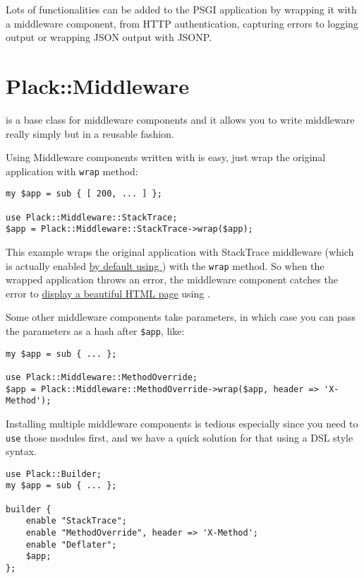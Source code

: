 Lots of functionalities can be added to the PSGI application by wrapping
it with a middleware component, from HTTP authentication, capturing
errors to logging output or wrapping JSON output with JSONP.

\section{Plack::Middleware}\label{plackmiddleware}

\href{http://search.cpan.org/perldoc?Plack::Middleware}{}
is a base class for middleware components and it allows you to write
middleware really simply but in a reusable fashion.

Using Middleware components written with  is easy, just
wrap the original application with \lstinline!wrap! method:

\begin{lstlisting}
my $app = sub { [ 200, ... ] };

use Plack::Middleware::StackTrace;
$app = Plack::Middleware::StackTrace->wrap($app);
\end{lstlisting}

This example wraps the original application with StackTrace middleware
(which is actually enabled
\href{http://advent.plackperl.org/2009/12/day-3-using-plackup.html}{by
default using }) with the \lstinline!wrap! method. So when the
wrapped application throws an error, the middleware component catches
the error to
\href{http://bulknews.typepad.com/blog/2009/10/develstacktraceashtml.html}{display
a beautiful HTML page} using .

Some other middleware components take parameters, in which case you can
pass the parameters as a hash after \lstinline!$app!, like:

\begin{lstlisting}
my $app = sub { ... };

use Plack::Middleware::MethodOverride;
$app = Plack::Middleware::MethodOverride->wrap($app, header => 'X-Method');
\end{lstlisting}

Installing multiple middleware components is tedious especially since
you need to \lstinline!use! those modules first, and we have a quick
solution for that using a DSL style syntax.

\begin{lstlisting}
use Plack::Builder;
my $app = sub { ... };

builder {
    enable "StackTrace";
    enable "MethodOverride", header => 'X-Method';
    enable "Deflater";
    $app;
};
\end{lstlisting}

